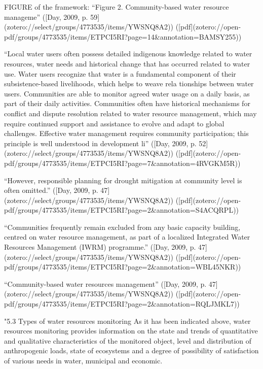 FIGURE of the framework: “Figure 2. Community-based water resource manageme” ([Day, 2009, p. 59](zotero://select/groups/4773535/items/YWSNQ8A2)) ([pdf](zotero://open-pdf/groups/4773535/items/ETPCI5RI?page=14&annotation=BAMSY255))

“Local water users often possess detailed indigenous knowledge related to water resources, water needs and historical change that has occurred related to water use. 
Water users recognize that water is a fundamental component of their subsistence-based livelihoods, which helps to weave rela tionships between water users. 
Communities are able to monitor agreed water usage on a daily basis, as part of their daily activities. 
Communities often have historical mechanisms for conflict and dispute resolution related to water resource management, which may require continued support and assistance to evolve and adapt to global challenges. 
Effective water management requires community participation; this principle is well understood in development li” ([Day, 2009, p. 52](zotero://select/groups/4773535/items/YWSNQ8A2)) ([pdf](zotero://open-pdf/groups/4773535/items/ETPCI5RI?page=7&annotation=4RVGKM5R))





“However, responsible planning for drought mitigation at community level is often omitted.” ([Day, 2009, p. 47](zotero://select/groups/4773535/items/YWSNQ8A2)) ([pdf](zotero://open-pdf/groups/4773535/items/ETPCI5RI?page=2&annotation=S4ACQRPL))

“Communities frequently remain excluded from any basic capacity building, centred on water resource management, as part of a localized Integrated Water Resources Management (IWRM) programme.” ([Day, 2009, p. 47](zotero://select/groups/4773535/items/YWSNQ8A2)) ([pdf](zotero://open-pdf/groups/4773535/items/ETPCI5RI?page=2&annotation=WBL45NKR))

“Community-based water resources management” ([Day, 2009, p. 47](zotero://select/groups/4773535/items/YWSNQ8A2)) ([pdf](zotero://open-pdf/groups/4773535/items/ETPCI5RI?page=2&annotation=RQLJMKL7))

"5.3 Types of water resources monitoring
As it has been indicated above, water resources monitoring provides information on the state and trends of quantitative and qualitative characteristics of the monitored object, level and distribution of anthropogenic loads, state of ecosystems and a degree of possibility of satisfaction of various needs in water, municipal and economic.

